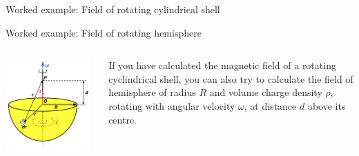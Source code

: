 {\begin{frame}{Worked example: Field of rotating cylindrical shell}
\end{frame}

%
%
%

\begin{frame}{Worked example: Field of rotating hemisphere}

  \begin{columns}
    \begin{column}{0.60\textwidth}
      \centering
      \includegraphics[width=0.95\textwidth]{./images/problems/lect05_bfield_of_rotating_semisphere_a_1}\\
    \end{column}
    \begin{column}{0.38\textwidth}
      If you have calculated the magnetic field of a rotating
      cyclindrical shell, you can also try to calculate the field of
      hemisphere of radius $R$ and volume charge density $\rho$,
      rotating with angular velocity $\omega$,
      at distance $d$ above its centre.
    \end{column}
  \end{columns}

\end{frame}

} %



